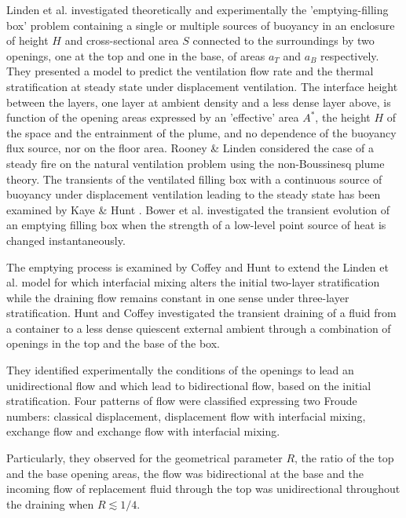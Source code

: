 \documentclass[preprint,12pt]{elsarticle}
\begin{document}
Linden et al. \cite{linden_lane-serff_smeed_1990} investigated theoretically and experimentally the 'emptying-filling box' problem containing a single or multiple sources of buoyancy in an enclosure of height \(H\) and cross-sectional area \(S\) connected to the surroundings by two openings, one at the top and one in the base, of areas \(a_T\) and \(a_B\) respectively. They presented a model to predict the ventilation flow rate and the thermal stratification at steady state under displacement ventilation. The interface height between the layers, one layer at ambient density and a less dense layer above, is function of the opening areas expressed by an 'effective' area \(A^*\), the height \(H\) of the space and the entrainment of the plume, and no dependence of the buoyancy flux source, nor on the floor area. Rooney \& Linden \cite{rooney_linden_1997} considered the case of a steady fire on the natural ventilation problem using the non-Boussinesq plume theory. The transients of the ventilated filling box with a continuous source of buoyancy under displacement ventilation leading to the steady state has been examined by Kaye \& Hunt \cite{kaye_hunt_2004}. Bower et al. \cite{bower_caulfield_2008} investigated the transient evolution of an emptying filling box when the strength of a low-level point source of heat is changed instantaneously.

The emptying process is examined by Coffey and Hunt
\cite{coffey_hunt_2010} to extend the Linden et al. model
\cite{linden_lane-serff_smeed_1990} for which interfacial mixing alters
the initial two-layer stratification while the draining flow remains
constant in one sense under three-layer stratification. Hunt and
Coffey \cite{hunt_coffey_2010} investigated the transient draining of a
fluid from a container to a less dense quiescent external ambient
through a combination of openings in the top and the base of the
box.

They identified experimentally the conditions of the openings to lead
an unidirectional flow and which lead to bidirectional flow, based on
the initial stratification. Four patterns of flow were classified
expressing two Froude numbers: classical displacement, displacement
flow with interfacial mixing, exchange flow  and exchange flow with
interfacial mixing.

Particularly, they observed for the geometrical parameter \(R\), the ratio of the top and the base opening areas, the flow was bidirectional at the base and the incoming flow of replacement fluid through the top was unidirectional throughout the draining when \(R\lesssim 1/4\).
\end{document}
